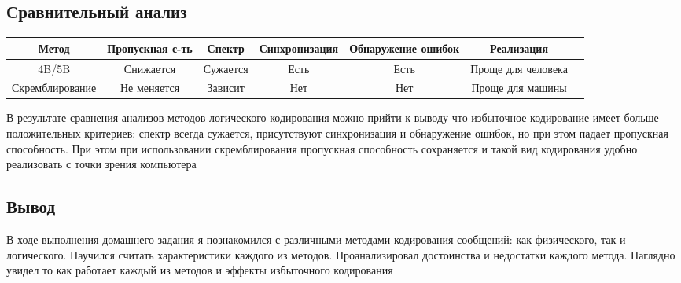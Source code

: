 \documentclass[12pt,a4paper]{report}
\begin{document}
\subsection*{Сравнительный анализ}
\begin{center}
    \begin{footnotesize}
        \hspace*{-2.9cm}
        \begin{tabular}{|c|c|c|c|c|c|c|}
            \hline
            \textbf{Метод} & \textbf{Пропускная с-ть} & \textbf{Спектр} & \textbf{Синхронизация} & \textbf{Обнаружение ошибок} & \textbf{Реализация} \\
            \hline
            4B/5B & Снижается & Сужается & Есть & Есть & Проще для человека \\
            \hline
            Скремблирование & Не меняется & Зависит & Нет & Нет & Проще для машины \\
            \hline
        \end{tabular}
    \end{footnotesize}
\end{center}
В результате сравнения анализов методов логического кодирования можно прийти к выводу что
избыточное кодирование имеет больше положительных критериев: спектр
всегда сужается, присутствуют синхронизация и обнаружение ошибок, но при этом падает пропускная способность.
При этом при использовании скремблирования пропускная способность сохраняется и такой вид кодирования
удобно реализовать с точки зрения компьютера

\subsection*{Вывод}
В ходе выполнения домашнего задания я познакомился с различными методами кодирования
сообщений: как физического, так и логического. Научился считать характеристики каждого из методов.
Проанализировал достоинства и недостатки каждого метода. Наглядно увидел то как работает каждый из методов и эффекты избыточного
кодирования
\end{document}
